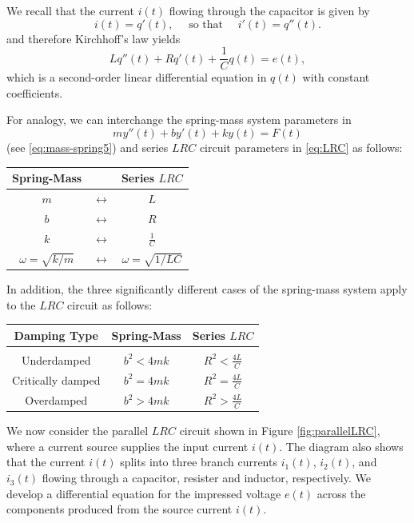 We recall that the current \(i(t)\) flowing through the capacitor is given by
\[i(t) = q'(t),\quad  \text{ so that }\quad  i'(t) = q''(t).\] and therefore Kirchhoff's law yields
\begin{equation}\label{eq:LRC}
	Lq''(t)+R  q'(t)+ \frac{1}{C} q(t) = e(t), 
\end{equation} which is a second-order linear differential equation in $q(t)$ with constant coefficients.

For analogy, we can interchange the spring-mass system parameters in \[my''(t)+ by'(t) + k y(t) = F(t)\] (see \eqref{eq:mass-spring5})
and  series \(LRC\) circuit parameters in \eqref{eq:LRC} as follows:
\begin{center}
	\begin{tabular}{ccc}
		\hline
		Spring-Mass  &     & Series \(LRC\)   \\ \hline
		\(m\) &\(\longleftrightarrow\)       & $L$ \\
		\(b\)  &\(\longleftrightarrow\)         & $R$ \\
		\(k\)    &\(\longleftrightarrow\)      & $\displaystyle\frac{1}{C}$ \\[2ex]
		\(\omega =\sqrt{k/m}\)&\(\longleftrightarrow\)  &\(\omega =\sqrt{1/LC}\)  \\[2ex]
		\hline
	\end{tabular}
\end{center}
In addition, the  three significantly different cases of the spring-mass system apply to the \(LRC\) circuit  as follows:
\begin{center}
	\begin{tabular}{ccc}
		\hline
		Damping Type &  Spring-Mass     & Series \(LRC\)   \\ 
		\hline\\ [-1ex]
		Underdamped &\(b^2< 4mk\)       & \(\displaystyle R^2<\frac{4L}{C}\) \\[2ex]
		Critically damped&\(b^2= 4mk\)         & \(\displaystyle R^2=\frac{4L}{C}\) \\[2ex]
		Overdamped  &\(b^2> 4mk\)      & \(\displaystyle R^2>\frac{4L}{C}\) \\[2ex]
		\hline
	\end{tabular}
\end{center}

We now consider the parallel $LRC$  circuit shown in Figure \ref{fig:parallelLRC}, where a current source supplies the input current $i(t)$. The diagram also shows that the  current $i(t)$ splits into three branch currents $i_1(t)$, $i_2(t)$, and $i_3(t)$ flowing through a capacitor, resister and inductor, respectively. We develop a differential equation for the impressed voltage  $e(t)$ across the components produced from the source current \(i(t).\)

